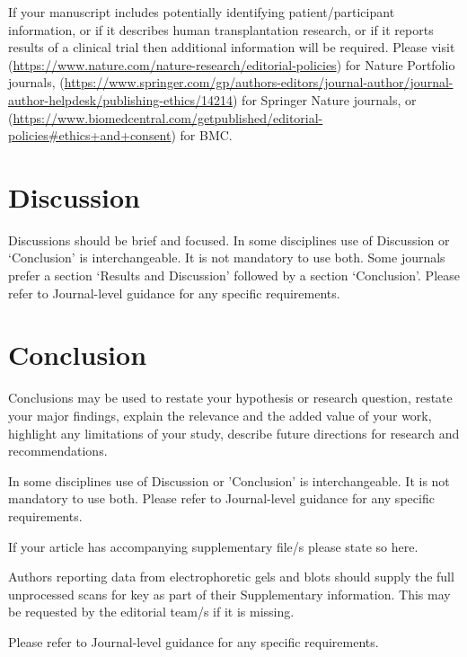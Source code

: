 \documentclass{article}
\begin{document}
If your manuscript includes potentially identifying patient/participant information, or if it describes human transplantation research, or if it reports results of a clinical trial then  additional information will be required. Please visit (\url{https://www.nature.com/nature-research/editorial-policies}) for Nature Portfolio journals, (\url{https://www.springer.com/gp/authors-editors/journal-author/journal-author-helpdesk/publishing-ethics/14214}) for Springer Nature journals, or (\url{https://www.biomedcentral.com/getpublished/editorial-policies\#ethics+and+consent}) for BMC.

\section{Discussion}\label{sec12}

Discussions should be brief and focused. In some disciplines use of Discussion or `Conclusion' is interchangeable. It is not mandatory to use both. Some journals prefer a section `Results and Discussion' followed by a section `Conclusion'. Please refer to Journal-level guidance for any specific requirements. 

\section{Conclusion}\label{sec13}

Conclusions may be used to restate your hypothesis or research question, restate your major findings, explain the relevance and the added value of your work, highlight any limitations of your study, describe future directions for research and recommendations. 

In some disciplines use of Discussion or 'Conclusion' is interchangeable. It is not mandatory to use both. Please refer to Journal-level guidance for any specific requirements. 

\backmatter


If your article has accompanying supplementary file/s please state so here. 

Authors reporting data from electrophoretic gels and blots should supply the full unprocessed scans for key as part of their Supplementary information. This may be requested by the editorial team/s if it is missing.

Please refer to Journal-level guidance for any specific requirements.

\end{document}
